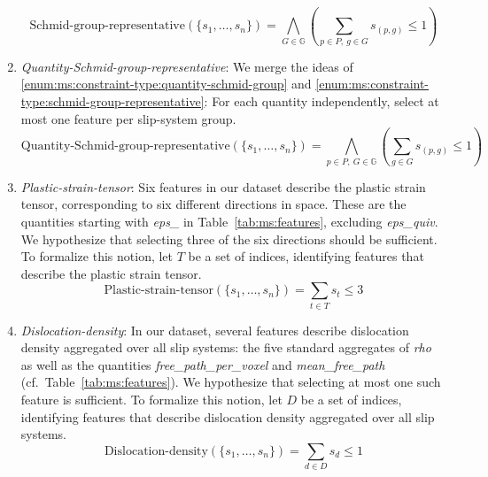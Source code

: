 \begin{enumerate}[label=(D\arabic*), wide]
\begin{equation}
		\text{Schmid-group-representative}(\{s_1, \dots, s_n\}) = \bigwedge_{G \in \mathbb{G}} \left( \sum_{p \in P,~g \in G} s_{(p,g)} \leq 1 \right)
		\label{eq:ms:constraint:schmid-group-representative}
	\end{equation}
	\item\label{enum:ms:constraint-type:quantity-schmid-group-representative} \emph{Quantity-Schmid-group-representative}:
	We merge the ideas of \ref{enum:ms:constraint-type:quantity-schmid-group} and \ref{enum:ms:constraint-type:schmid-group-representative}:
	For each quantity independently, select at most one feature per slip-system group.
	\begin{equation}
		\text{Quantity-Schmid-group-representative}(\{s_1, \dots, s_n\}) = \bigwedge_{p \in P,~G \in \mathbb{G}} \left( \sum_{g \in G} s_{(p,g)} \leq 1 \right)
		\label{eq:ms:constraint:quantity-schmid-group-representative}
	\end{equation}
	\item\label{enum:ms:constraint-type:plastic-strain-tensor} \emph{Plastic-strain-tensor}:
	Six features in our dataset describe the plastic strain tensor, corresponding to six different directions in space.
	These are the quantities starting with \emph{eps\_} in Table~\ref{tab:ms:features}, excluding \emph{eps\_quiv}.
	We hypothesize that selecting three of the six directions should be sufficient.
	To formalize this notion, let $T$ be a set of indices, identifying features that describe the plastic strain tensor.
	\begin{equation}
		\text{Plastic-strain-tensor}(\{s_1, \dots, s_n\}) = \sum_{t \in T} s_t \leq 3
		\label{eq:ms:constraint:plastic-strain-tensor}
	\end{equation}
	\item\label{enum:ms:constraint-type:dislocation-density} \emph{Dislocation-density}:
	In our dataset, several features describe dislocation density aggregated over all slip systems:
	the five standard aggregates of \emph{rho} as well as the quantities \emph{free\_path\_per\_voxel} and \emph{mean\_free\_path} (cf.~Table~\ref{tab:ms:features}).
	We hypothesize that selecting at most one such feature is sufficient.
	To formalize this notion, let $D$ be a set of indices, identifying features that describe dislocation density aggregated over all slip systems.
	\begin{equation}
		\text{Dislocation-density}(\{s_1, \dots, s_n\}) = \sum_{d \in D} s_d \leq 1
		\label{eq:ms:dislocation-density}
	\end{equation}

\end{enumerate}
